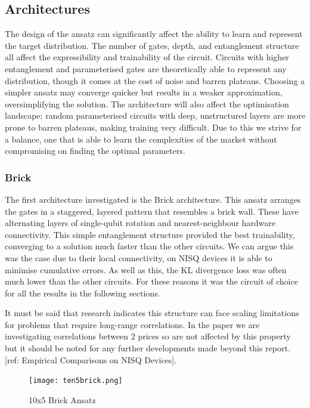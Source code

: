 \documentclass[12pt]{article}
\newcommand{\newp}
    {
    \vskip 0.5cm 
  }
\numberwithin{equation}{section}
\begin{document}
\subsection{Architectures}
The design of the ansatz can significantly affect the ability to learn and represent 
the target distribution. The number of gates, depth, and entanglement structure
all affect the expressibility and trainability of the circuit. Circuits with 
higher entanglement and parameterised gates are theoretically able to represent 
any distribution, though it comes at the cost of noise and barren plateaus. 
Choosing a simpler ansatz may converge quicker but results in a weaker approximation,
oversimplifying the solution.
The architecture will also affect the optimisation landscape; random parameterised 
circuits with deep, unstructured layers are more prone to barren plateaus, making 
training very difficult. Due to this we strive for a balance, one that is 
able to learn the complexities of the market without compromising on finding the 
optimal parameters.
\subsubsection{Brick}
The first architecture investigated is the Brick architecture. This ansatz arranges
the gates in a staggered, layered pattern that resembles a brick wall. These 
have alternating layers of single-qubit rotation and nearest-neighbour hardware
connectivity. This simple
entanglement structure provided the best trainability, converging to a solution 
much faster than the other circuits. We can argue this was the case due to 
their local connectivity, on NISQ devices it is able to minimise cumulative 
errors. 
As well as this, the KL divergence loss was 
often much lower than the other circuits. For these reasons it was the circuit 
of choice for all the results in the following sections.
\newp 
It must be said that research indicates this structure can face scaling limitations 
for problems that require long-range correlations. In the paper we are investigating 
correlations between 2 prices so are not affected by this property but it should 
be noted for any further developments made beyond this report. [ref:  Empirical Comparisons on NISQ Devices]. 

\begin{figure}[h!]
  \centering 
  \texttt{[image: ten5brick.png]}
  \caption{10x5 Brick Ansatz}
  \label{fig:brick}
\end{figure}
\end{document}
